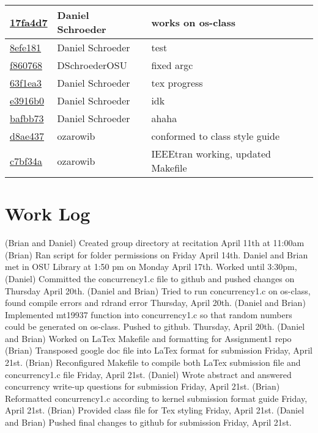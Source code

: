 \documentclass[10pt,letterpaper,draftclsnofoot,onecolumn]{IEEEtran}
\begin{document}
\begin{tabular}{l l l}
\href{https://github.com/DSchroederOSU/CS444-Group\_11\_05/commit/17fa4d7daa607f5a8466d4c854083fe763728c40}{17fa4d7} & Daniel Schroeder & works on os-class\\\hline
\href{https://github.com/DSchroederOSU/CS444-Group\_11\_05/commit/8efe18126d63f4c3156da70cb6e8d6f3bb95dcf6}{8efe181} & Daniel Schroeder & test\\\hline
\href{https://github.com/DSchroederOSU/CS444-Group\_11\_05/commit/f86076889a02b98fd55cc73c537e49ce93315ea4}{f860768} & DSchroederOSU & fixed argc\\\hline
\href{https://github.com/DSchroederOSU/CS444-Group\_11\_05/commit/63f1ea3079fb2044a5fd16f4f60ed0afcecbca13}{63f1ea3} & Daniel Schroeder & tex progress\\\hline
\href{https://github.com/DSchroederOSU/CS444-Group\_11\_05/commit/e3916b0f556dc4093d8689662850a7ac1a0a3e71}{e3916b0} & Daniel Schroeder & idk\\\hline
\href{https://github.com/DSchroederOSU/CS444-Group\_11\_05/commit/bafbb7390e8525a17d2ad32ccd003c800ed0b4f0}{bafbb73} & Daniel Schroeder & ahaha\\\hline
\href{https://github.com/DSchroederOSU/CS444-Group\_11\_05/commit/d8ae437d3f4dffe4287eab3471225d489f16af0a}{d8ae437} & ozarowib & conformed to class style guide\\\hline
\href{https://github.com/DSchroederOSU/CS444-Group\_11\_05/commit/c7bf34a5a0bdc36bfc9815bdf012847cb9b6b3da}{c7bf34a} & ozarowib & IEEEtran working, updated Makefile\\\hline\end{tabular}

\section{Work Log}
\noindent
(Brian and Daniel) Created group directory at recitation April 11th at 11:00am
(Brian) Ran script for folder permissions on Friday April 14th.
Daniel and Brian met in OSU Library at 1:50 pm on Monday April 17th. Worked until 3:30pm, 
(Daniel) Committed the concurrency1.c file to github and pushed changes on Thursday April 20th.
(Daniel and Brian) Tried to run concurrency1.c on os-class, found compile errors and rdrand error Thursday, April 20th.
(Daniel and Brian) Implemented mt19937 function into concurrency1.c so that random numbers could be generated on os-class. Pushed to github. Thursday, April 20th.
(Daniel and Brian) Worked on LaTex Makefile and formatting for Assignment1 repo
(Brian) Transposed google doc file into LaTex format for submission Friday, April 21st.
(Brian) Reconfigured Makefile to compile both LaTex submission file and concurrency1.c file Friday, April 21st.
(Daniel) Wrote abstract and answered concurrency write-up questions for submission Friday, April 21st.
(Brian) Reformatted concurrency1.c according to kernel submission format guide Friday, April 21st.
(Brian) Provided class file for Tex styling Friday, April 21st.
(Daniel and Brian) Pushed final changes to github for submission Friday, April 21st.
\par
\end{document}
